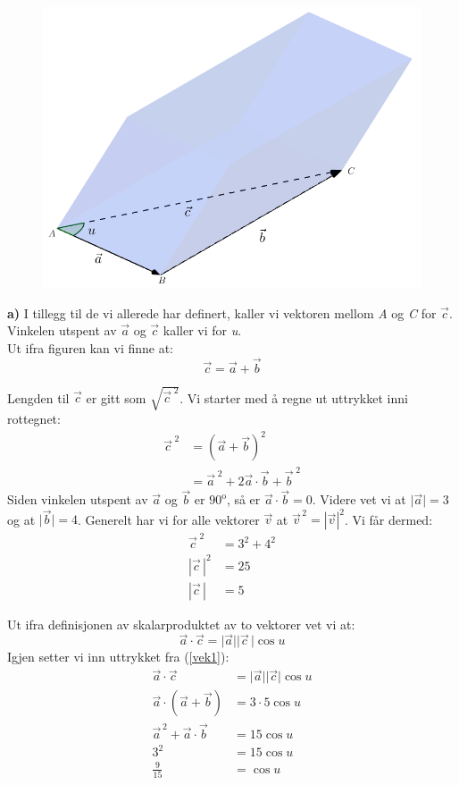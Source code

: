 \documentclass[english, 11 pt]{report}
\begin{document}
\begin{figure}[H]
	\centering
	\includegraphics[scale=0.5]{fig1}
\end{figure}

\textbf{a)} I tillegg til de vi allerede har definert, kaller vi vektoren mellom \textit{A} og \textit{C} for $ \vec c $. Vinkelen utspent av $ \vec a $ og $ \vec c $ kaller vi for \textit{u}. \\

Ut ifra figuren kan vi finne at:
\begin{equation}
\vec c=\vec a + \vec b \label{vek1}
\end{equation}

Lengden til $ \vec c $ er gitt som $ \sqrt{\vec {c}^{\;2}} $. Vi starter med å regne ut uttrykket inni rottegnet:
\begin{align*}
	\vec {c}^{\;2} &= (\vec a + \vec b)^2 \\
	 &= \vec {a}^{\;2} +2\vec a \cdot \vec b + \vec {b}^{\;2}
\end{align*}
Siden vinkelen utspent av $ \vec a $ og $ \vec b $ er $ 90^\mathrm{o} $, så er $ \vec a \cdot \vec b=0 $. Videre vet vi at $ \lvert \vec a \rvert =3$ og at $ \lvert \vec b \rvert =4$. Generelt har vi for alle vektorer $ \vec{v} $ at $ \vec{v}^{\,2}=|\vec v|^2 $. Vi får dermed:
\begin{align*}
\vec {c}^{\;2} &= 3^2+4^2 \\
|\vec c\,|^2 &=25 \\
|\vec c\,| &= 5 
\end{align*}

Ut ifra definisjonen av skalarproduktet av to vektorer vet vi at:
\[ \vec{a}\cdot \vec c = \lvert \vec a \rvert \lvert \vec c\, \rvert \cos u \] 
Igjen setter vi inn uttrykket fra (\ref{vek1}):
\begin{align*}
\vec a \cdot \vec c &=\lvert \vec a \rvert \lvert \vec c \rvert \cos u \\
\vec a \cdot (\vec a + \vec b)  &= 3 \cdot 5 \cos u \\
\vec{a}^{\,2} + \vec a \cdot \vec b & =  15 \cos u \\
3^2 &= 15 \cos u \\
\frac{9}{15} &=\cos u
\end{align*}
\end{document}
